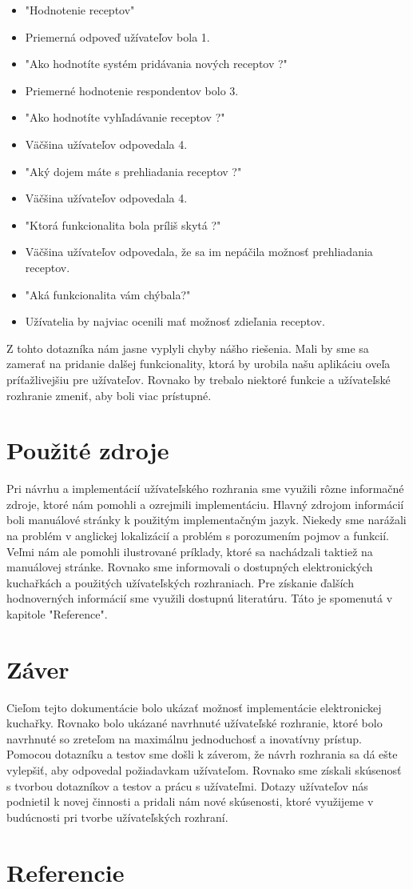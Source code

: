 \documentclass[12pt,a4paper,titlepage,final]{article}
\begin{document}
\begin{itemize}
\item "Hodnotenie receptov"
\item Priemerná odpoveď užívateľov bola 1.


\item "Ako hodnotíte systém pridávania nových receptov ?"
\item Priemerné hodnotenie respondentov bolo 3.


\item "Ako hodnotíte vyhľadávanie receptov ?"
\item Väčšina užívateľov odpovedala 4.


\item "Aký dojem máte s prehliadania receptov ?"
\item Väčšina užívateľov odpovedala 4.

\item "Ktorá funkcionalita bola príliš skytá ?"
\item Väčšina užívateľov odpovedala, že sa im nepáčila možnosť prehliadania receptov.
 
\item "Aká funkcionalita vám chýbala?"
\item Užívatelia by najviac ocenili mať možnosť zdieľania receptov. 
\end{itemize}
Z tohto dotazníka nám jasne vyplyli chyby nášho riešenia. Mali by sme sa zamerať na pridanie dalšej funkcionality, ktorá by urobila našu aplikáciu oveľa príťažlivejšiu pre užívateľov. Rovnako by trebalo niektoré funkcie a užívateľské rozhranie zmeniť, aby boli viac prístupné.


\section{Použité zdroje}
Pri návrhu a implementácií užívateľského rozhrania sme využili rôzne informačné zdroje, ktoré nám pomohli a ozrejmili implementáciu. Hlavný zdrojom informácií boli manuálové stránky k použitým implementačným jazyk. Niekedy sme narážali na problém v anglickej lokalizácií a problém s porozumením pojmov a funkcií. Veľmi nám ale pomohli ilustrované príklady, ktoré sa nachádzali taktiež na manuálovej stránke. Rovnako sme informovali o dostupných elektronických kuchařkách a použitých užívateľských rozhraniach. Pre získanie ďalších hodnoverných informácií sme využili dostupnú literatúru. Táto je spomenutá v kapitole "Reference".

\section{Záver}
Cieľom tejto dokumentácie bolo ukázať možnosť implementácie elektronickej kuchařky. Rovnako bolo ukázané navrhnuté užívateľské rozhranie, ktoré bolo navrhnuté so zreteľom na maximálnu jednoduchosť a inovatívny prístup. Pomocou dotazníku a testov sme došli k záverom, že návrh rozhrania sa dá ešte vylepšiť, aby odpovedal požiadavkam užívateľom. Rovnako sme získali skúsenosť s tvorbou dotazníkov a testov a prácu s užívateľmi. Dotazy užívateľov nás podnietil k novej činnosti a pridali nám nové skúsenosti, ktoré využijeme v budúcnosti pri tvorbe užívateľských rozhraní.
\newpage

\section{Referencie}





\end{document}
